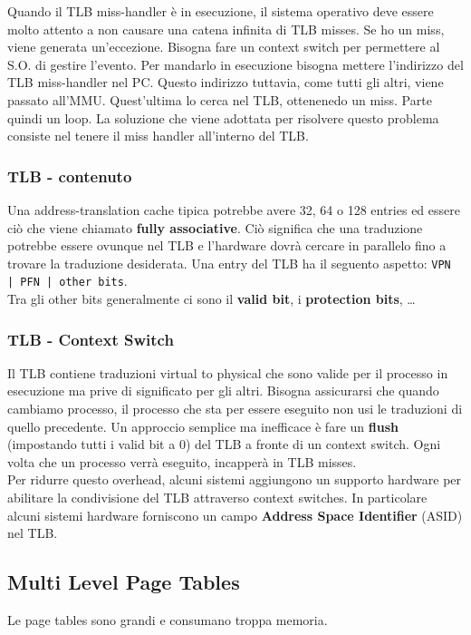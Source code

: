 \documentclass[12pt, twoside, letterpaper]{article}
\begin{document}
				Quando il TLB miss-handler è in esecuzione, il sistema operativo deve essere molto attento a non causare una catena infinita di TLB misses. Se ho un miss, viene generata un'eccezione. Bisogna fare un context switch per permettere al S.O. di gestire l'evento. Per mandarlo in esecuzione bisogna mettere l'indirizzo del TLB miss-handler nel PC. Questo indirizzo tuttavia, come tutti gli altri, viene passato all'MMU. Quest'ultima lo cerca nel TLB, ottenenedo un miss. Parte quindi un loop. La soluzione che viene adottata per risolvere questo problema consiste nel tenere il miss handler all'interno del TLB.
				
				
			\subsubsection{TLB - contenuto}
				Una address-translation cache tipica potrebbe avere 32, 64 o 128 entries ed essere ciò che viene chiamato \textbf{fully associative}. Ciò significa che una traduzione potrebbe essere ovunque nel TLB e l'hardware dovrà cercare in parallelo fino a trovare la traduzione desiderata. Una entry del TLB ha il seguento aspetto: \texttt{VPN | PFN | other bits}.\\
				Tra gli other bits generalmente ci sono il \textbf{valid bit}, i \textbf{protection bits}, \dots
				
			\subsubsection{TLB - Context Switch}
				Il TLB contiene traduzioni virtual to physical che sono valide per il processo in esecuzione ma prive di significato per gli altri. Bisogna assicurarsi che quando cambiamo processo, il processo che sta per essere eseguito non usi le traduzioni di quello precedente. Un approccio semplice ma inefficace è fare un \textbf{flush} (impostando tutti i valid bit a 0) del TLB a fronte di un context switch. Ogni volta che un processo verrà eseguito, incapperà in TLB misses.\\
				Per ridurre questo overhead, alcuni sistemi aggiungono un supporto hardware per abilitare la condivisione del TLB attraverso context switches. In particolare alcuni sistemi hardware forniscono un campo \textbf{Address Space Identifier} (ASID) nel TLB. 
				
		\subsection{Multi Level Page Tables}		
			Le page tables sono grandi e consumano troppa memoria. 
			
\end{document}
